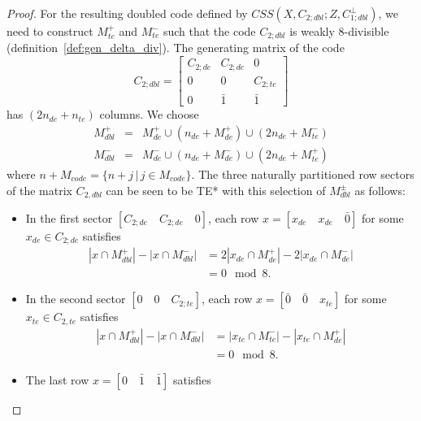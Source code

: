 \documentclass[10pt,a4paper]{amsart}
\begin{document}
\begin{proof}
    For the resulting doubled code defined by $CSS(X,C_{2;dbl};Z,C_{1;dbl}^\perp)$, we need to construct $M_{te}^+$ and $M_{te}^-$ such that the code $C_{2;dbl}$ is weakly $8$-divisible (definition~\ref{def:gen_delta_div}). The generating matrix of the code 
    \begin{equation}
    C_{2;dbl}= \begin{bmatrix}
                    C_{2;de} &  C_{2;de} &  0 \\
                    0 & 0 &  C_{2;te} \\
                    0 & \bar{1} & \bar{1}
                \end{bmatrix}
    \end{equation}has $(2n_{de}+n_{te})$ columns. We choose
    \begin{eqnarray}
        M_{dbl}^+&=&M_{de}^+ \cup (n_{de}+M_{de}^+)\cup(2n_{de}+M_{te}^-) \\M_{dbl}^-&=&M_{de}^- \cup (n_{de}+M_{de}^-)\cup(2n_{de}+M_{te}^+)
    \end{eqnarray}
    where $n+M_{code}=\{n+j\,|\,j\in M_{code}\}$. The three naturally partitioned row sectors of the matrix $C_{2,dbl}$ can be seen to be TE* with this selection of $M_{dbl}^{\pm}$ as follows:
    \begin{itemize}
        \item In the first sector $[C_{2;de}\quad C_{2;de} \quad 0]$, each row $x = [x_{de}\quad x_{de} \quad \bar{0}]$ for some $x_{de}\in C_{2;de}$ satisfies 
        \begin{equation}
        \begin{split}
        |x \cap M_{dbl}^+|-|x \cap M_{dbl}^-|&=2|x_{de}\cap M_{de}^+|-2|x_{de}\cap M_{de}^-|\\
        &=0\mod{8}.
        \end{split}
        \end{equation}
        \item In the second sector $[0\quad 0 \quad C_{2;te}]$, each row $x = [\bar{0}\quad \bar{0} \quad x_{te}]$ for some $x_{te}\in C_{2,te}$ satisfies 
       \begin{equation}
       \begin{split}
        |x \cap M_{dbl}^+|-|x \cap M_{dbl}^-|&=|x_{te}\cap M_{te}^-|-|x_{te}\cap M_{de}^+|\\
        &=0\mod{8}.
        \end{split}
        \end{equation}        
        \item The last row $x=[0\quad \bar{1} \quad \bar{1}]$ satisfies

\end{itemize}
\end{proof}
\end{document}
